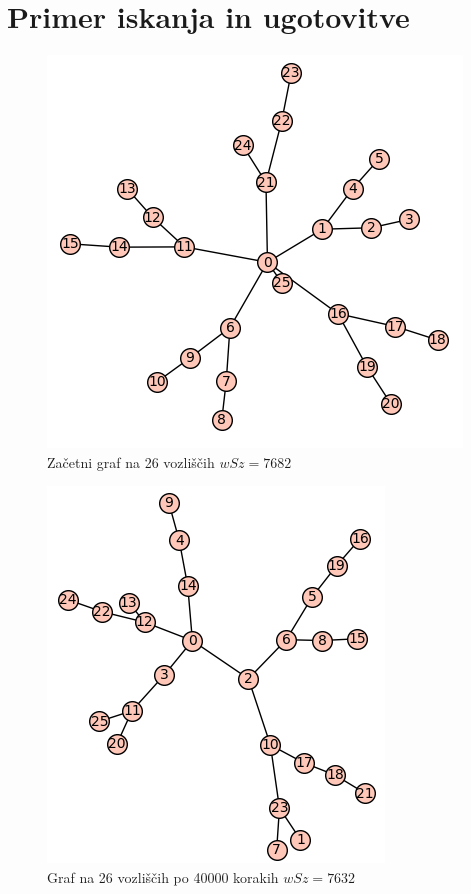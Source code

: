 \documentclass[12pt, a4paper]{article}
\begin{document}
\newpage
\section[Primer iskanja in ugotovitve]{Primer iskanja in ugotovitve}

\begin{figure}[h]
\centering
\includegraphics[scale=0.7]{iskanje_graf26}
\caption{Začetni graf na 26 vozliščih $wSz = 7682$}
\end{figure}

\begin{figure}[h]
\centering
\includegraphics[scale=0.7]{iskanje_graf26_2}
\caption{Graf na 26 vozliščih po 40000 korakih $wSz = 7632$}
\end{figure}
\end{document}
